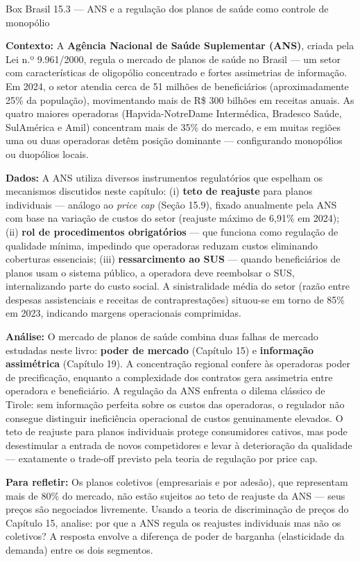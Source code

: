 \documentclass[11pt,twoside,openright]{book}
\begin{document}
\begin{boxbrasilbox}{Box Brasil 15.3 — ANS e a regulação dos planos de saúde como controle de monopólio}

\textbf{Contexto:} A \textbf{Agência Nacional de Saúde Suplementar
(ANS)}, criada pela Lei n.º 9.961/2000, regula o mercado de planos de
saúde no Brasil --- um setor com características de oligopólio
concentrado e fortes assimetrias de informação. Em 2024, o setor atendia
cerca de 51 milhões de beneficiários (aproximadamente 25\% da
população), movimentando mais de R\$ 300 bilhões em receitas anuais. As
quatro maiores operadoras (Hapvida-NotreDame Intermédica, Bradesco
Saúde, SulAmérica e Amil) concentram mais de 35\% do mercado, e em
muitas regiões uma ou duas operadoras detêm posição dominante ---
configurando monopólios ou duopólios locais.

\textbf{Dados:} A ANS utiliza diversos instrumentos regulatórios que
espelham os mecanismos discutidos neste capítulo: (i) \textbf{teto de
reajuste} para planos individuais --- análogo ao \emph{price cap} (Seção
15.9), fixado anualmente pela ANS com base na variação de custos do
setor (reajuste máximo de 6,91\% em 2024); (ii) \textbf{rol de
procedimentos obrigatórios} --- que funciona como regulação de qualidade
mínima, impedindo que operadoras reduzam custos eliminando coberturas
essenciais; (iii) \textbf{ressarcimento ao SUS} --- quando beneficiários
de planos usam o sistema público, a operadora deve reembolsar o SUS,
internalizando parte do custo social. A sinistralidade média do setor
(razão entre despesas assistenciais e receitas de contraprestações)
situou-se em torno de 85\% em 2023, indicando margens operacionais
comprimidas.

\textbf{Análise:} O mercado de planos de saúde combina duas falhas de
mercado estudadas neste livro: \textbf{poder de mercado} (Capítulo 15) e
\textbf{informação assimétrica} (Capítulo 19). A concentração regional
confere às operadoras poder de precificação, enquanto a complexidade dos
contratos gera assimetria entre operadora e beneficiário. A regulação da
ANS enfrenta o dilema clássico de Tirole: sem informação perfeita sobre
os custos das operadoras, o regulador não consegue distinguir
ineficiência operacional de custos genuinamente elevados. O teto de
reajuste para planos individuais protege consumidores cativos, mas pode
desestimular a entrada de novos competidores e levar à deterioração da
qualidade --- exatamente o trade-off previsto pela teoria de regulação
por price cap.

\textbf{Para refletir:} Os planos coletivos (empresariais e por adesão),
que representam mais de 80\% do mercado, não estão sujeitos ao teto de
reajuste da ANS --- seus preços são negociados livremente. Usando a
teoria de discriminação de preços do Capítulo 15, analise: por que a ANS
regula os reajustes individuais mas não os coletivos? A resposta envolve
a diferença de poder de barganha (elasticidade da demanda) entre os dois
segmentos.

\end{boxbrasilbox}
\end{document}
